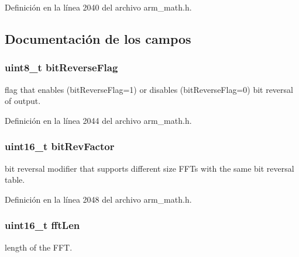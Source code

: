 Definición en la línea 2040 del archivo arm\+\_\+math.\+h.



\subsection{Documentación de los campos}
\subsubsection[{\texorpdfstring{bit\+Reverse\+Flag}{bitReverseFlag}}]{\setlength{\rightskip}{0pt plus 5cm}uint8\+\_\+t bit\+Reverse\+Flag}\hypertarget{structarm__cfft__radix4__instance__q31_a09a221a818c6d0e064557a99e2fe9a8b}{}\label{structarm__cfft__radix4__instance__q31_a09a221a818c6d0e064557a99e2fe9a8b}
flag that enables (bit\+Reverse\+Flag=1) or disables (bit\+Reverse\+Flag=0) bit reversal of output. 

Definición en la línea 2044 del archivo arm\+\_\+math.\+h.

\subsubsection[{\texorpdfstring{bit\+Rev\+Factor}{bitRevFactor}}]{\setlength{\rightskip}{0pt plus 5cm}uint16\+\_\+t bit\+Rev\+Factor}\hypertarget{structarm__cfft__radix4__instance__q31_a33386d95319dc3ee7097b3a8e52e01ec}{}\label{structarm__cfft__radix4__instance__q31_a33386d95319dc3ee7097b3a8e52e01ec}
bit reversal modifier that supports different size F\+F\+Ts with the same bit reversal table. 

Definición en la línea 2048 del archivo arm\+\_\+math.\+h.

\subsubsection[{\texorpdfstring{fft\+Len}{fftLen}}]{\setlength{\rightskip}{0pt plus 5cm}uint16\+\_\+t fft\+Len}\hypertarget{structarm__cfft__radix4__instance__q31_ab8db3bbe7c61e6bb8ca2a55e3446e11a}{}\label{structarm__cfft__radix4__instance__q31_ab8db3bbe7c61e6bb8ca2a55e3446e11a}
length of the F\+FT. 

